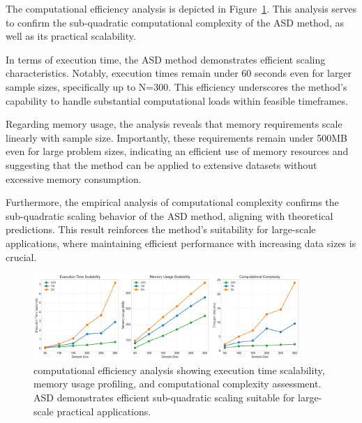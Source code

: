 \documentclass[final,3p,fleqn, 10pt]{elsarticle}
\begin{document}
The computational efficiency analysis is depicted in Figure~\ref{fig:efficiency_analysis}. This analysis serves to confirm the sub-quadratic computational complexity of the ASD method, as well as its practical scalability.

In terms of execution time, the ASD method demonstrates efficient scaling characteristics. Notably, execution times remain under 60 seconds even for larger sample sizes, specifically up to N=300. This efficiency underscores the method's capability to handle substantial computational loads within feasible timeframes.

Regarding memory usage, the analysis reveals that memory requirements scale linearly with sample size. Importantly, these requirements remain under 500MB even for large problem sizes, indicating an efficient use of memory resources and suggesting that the method can be applied to extensive datasets without excessive memory consumption.

Furthermore, the empirical analysis of computational complexity confirms the sub-quadratic scaling behavior of the ASD method, aligning with theoretical predictions. This result reinforces the method's suitability for large-scale applications, where maintaining efficient performance with increasing data sizes is crucial.


\begin{figure}[htb!]
    \centering
    \includegraphics[width=0.9\textwidth]{stage4_enhanced_visualizations/efficiency_enhanced/efficiency_comparison_enhanced.png}
    \caption{computational efficiency analysis showing execution time scalability, memory usage profiling, and computational complexity assessment. ASD demonstrates efficient sub-quadratic scaling suitable for large-scale practical applications.}
    \label{fig:efficiency_analysis}
\end{figure}
\end{document}
